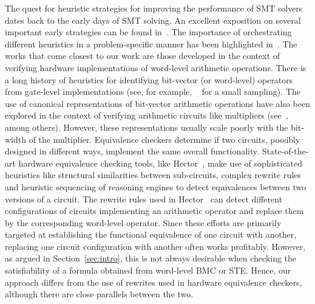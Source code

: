 The quest for heuristic strategies for improving the performance of
SMT solvers dates back to the early days of SMT solving.  An excellent
exposition on several important early strategies can be found
in~\cite{barrett}.  The importance of orchestrating different
heuristics in a problem-specific manner has been highlighted
in~\cite{deMoura2013}.%
The works that come closest to our work are those developed in the
context of verifying hardware implementations of word-level arithmetic
operations.  There is a long history of heuristics for identifying
bit-vector (or word-level) operators from gate-level implementations
(see, for example,
~\cite{kunz,ciesielski,reveng,earlier-pat-match-synopsys} for a small
sampling).  The use of canonical representations of bit-vector
arithmetic operations have also been explored in the context of
verifying arithmetic circuits like multipliers
(see~\cite{bmd,drechsler}, among others).  However, these
representations usually scale poorly with the bit-width of the
multiplier.  Equivalence checkers determine if two circuits, possibly
designed in different ways, implement the same overall functionality.
State-of-the-art hardware equivalence checking tools, like
Hector~\cite{hector}, make use of sophisticated heuristics like
structural similarities between sub-circuits, complex rewrite rules
and heuristic sequencing of reasoning engines to detect equivalences
between two versions of a circuit.  The rewrite rules used in
Hector~\cite{kolbl} can detect different configurations of circuits
implementing an arithmetic operator and replace them by the
corresponding word-level operator.  Since these efforts are primarily
targeted at establishing the functional equivalence of one circuit
with another, replacing one circuit configuration with another often
works profitably.  However, as argued in Section~\ref{sec:intro}, this
is not always desirable when checking the satisfiability of a formula
obtained from word-level BMC or STE.  Hence, our approach
differs from the use of rewrites used in hardware equivalence
checkers, although there are close parallels between the two. %

